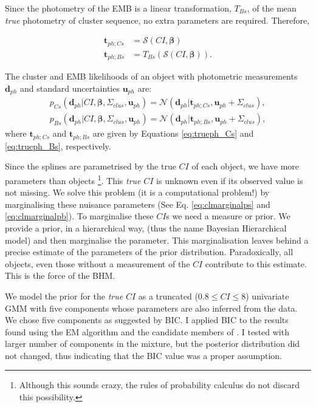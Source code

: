 Since the photometry of the EMB is a linear transformation, $T_{Bs}$, of the mean \emph{true} photometry of cluster sequence, no extra parameters are required. Therefore, 

\begin{align}
\boldsymbol{t}_{ph;Cs} &= \boldsymbol{\mathcal{S}}(CI, \boldsymbol{\beta}) \label{eq:trueph_Cs}\\
\boldsymbol{t}_{ph;Bs} &=T_{Bs}( \boldsymbol{\mathcal{S}}(CI, \boldsymbol{\beta})).
\label{eq:trueph_Bs}
\end{align}

The cluster and EMB likelihoods of an object with photometric measurements $\mathbf{d}_{ph}$ and standard uncertainties $\mathbf{u}_{ph}$ are:
\begin{align}
\label{eq:lik-seq}
 p_{Cs}(\mathbf{d}_{ph}| CI, \boldsymbol{\beta},\Sigma_{clus},\mathbf{u}_{ph})={\mathcal{N}}(\mathbf{d}_{ph}|\boldsymbol{t}_{ph;Cs}, \mathbf{u}_{ph}+\Sigma_{clus}),\nonumber \\
p_{Bs}(\mathbf{d}_{ph}| CI, \boldsymbol{\beta},\Sigma_{clus}, \mathbf{u}_{ph})={\mathcal{N}}(\mathbf{d}_{ph}|\boldsymbol{t}_{ph;Bs}, \mathbf{u}_{ph}+\Sigma_{clus}),
\end{align}
where $\boldsymbol{t}_{ph;Cs}$ and $\boldsymbol{t}_{ph;Bs}$ are given by Equations \ref{eq:trueph_Cs} and \ref{eq:trueph_Bs}, respectively.

Since the splines are parametrised by the true $CI$ of each object, we have more parameters than objects \footnote{Although this sounds crazy, the rules of probability calculus do not discard this possibility.}. This \emph{true} $CI$ is unknown even if its observed value is not missing. We solve this problem (it is a computational problem!) by marginalising these nuisance parameters (See Eq. \ref{eq:clmarginalps} and \ref{eq:clmarginalpb}). To marginalise these $CI$s we need a measure or prior. We provide a prior, in a hierarchical way, (thus the name Bayesian Hierarchical model) and then marginalise the parameter. This marginalisation leaves behind a precise estimate of the parameters of the prior distribution. Paradoxically, all objects, even those without a measurement of the $CI$ contribute to this estimate. This is the force of the BHM.

We model the prior for the \emph{true} $CI$  as a truncated ($0.8\leq CI \leq8$) univariate GMM with five components whose parameters are also inferred from the data. We chose five components as suggested by BIC. I applied BIC to the results found using the EM algorithm and the candidate members of \citet{Bouy2015}. I tested with larger number of components in the mixture, but the posterior distribution did not changed, thus indicating that the BIC value was a proper assumption.

